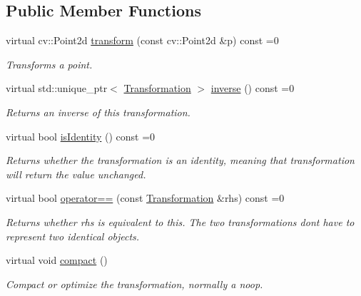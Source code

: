 \subsection*{Public Member Functions}
\begin{DoxyCompactItemize}
\item 
virtual cv\+::\+Point2d \hyperlink{structdg_1_1deepcore_1_1geometry_1_1_transformation_a1a7c7cf330f61adeba1803dd3651d479}{transform} (const cv\+::\+Point2d \&p) const =0
\begin{DoxyCompactList}\small\item\em Transforms a point. \end{DoxyCompactList}\item 
virtual std\+::unique\+\_\+ptr$<$ \hyperlink{structdg_1_1deepcore_1_1geometry_1_1_transformation}{Transformation} $>$ \hyperlink{structdg_1_1deepcore_1_1geometry_1_1_transformation_a2f707de3ae95f13861d5ddbb2125b26c}{inverse} () const =0
\begin{DoxyCompactList}\small\item\em Returns an inverse of this transformation. \end{DoxyCompactList}\item 
virtual bool \hyperlink{structdg_1_1deepcore_1_1geometry_1_1_transformation_a7423095c12275c3ade1bad443f47dbdd}{is\+Identity} () const =0
\begin{DoxyCompactList}\small\item\em Returns whether the transformation is an identity, meaning that transformation will return the value unchanged. \end{DoxyCompactList}\item 
virtual bool \hyperlink{structdg_1_1deepcore_1_1geometry_1_1_transformation_a18f3dec54c0018c032e24d294a4e63a6}{operator==} (const \hyperlink{structdg_1_1deepcore_1_1geometry_1_1_transformation}{Transformation} \&rhs) const =0
\begin{DoxyCompactList}\small\item\em Returns whether {\ttfamily rhs} is equivalent to this. The two transformations don\textquotesingle{}t have to represent two identical objects. \end{DoxyCompactList}\item 
virtual void \hyperlink{structdg_1_1deepcore_1_1geometry_1_1_transformation_aa6ae47727744b0ed3eed5630bfcc8e98}{compact} ()
\begin{DoxyCompactList}\small\item\em Compact or optimize the transformation, normally a noop. \end{DoxyCompactList}\item 

\end{DoxyCompactItemize}

